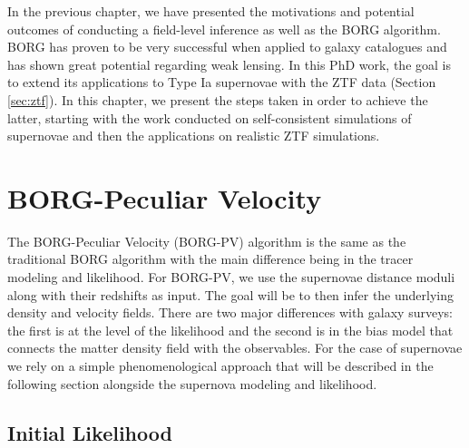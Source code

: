 In the previous chapter, we have presented the motivations and potential outcomes of conducting a field-level inference as well as the BORG algorithm. 
BORG has proven to be very successful 
when applied to galaxy catalogues and has shown great potential regarding weak lensing. In this PhD work, the goal is 
to extend its applications to Type Ia supernovae with the ZTF data (Section \ref{sec:ztf}). In this chapter, we present the steps taken in order to achieve the latter, 
starting with the work conducted on self-consistent simulations of supernovae and then the applications on realistic ZTF simulations. \\


\section{BORG-Peculiar Velocity}

The BORG-Peculiar Velocity (BORG-PV) algorithm is the same as the traditional BORG algorithm with the main difference being in the tracer modeling and likelihood. For BORG-PV, we 
use the supernovae distance moduli along with their redshifts as input. The goal will be to then infer the underlying density and velocity fields. 
There are two major differences with galaxy surveys: the first is at the level of the likelihood and the second is in the bias model that connects the matter density field with 
the observables. 
For the case of supernovae we rely on a simple phenomenological approach that will be described in the 
following section alongside the supernova modeling and likelihood. \\ 

\subsection{Initial Likelihood}

